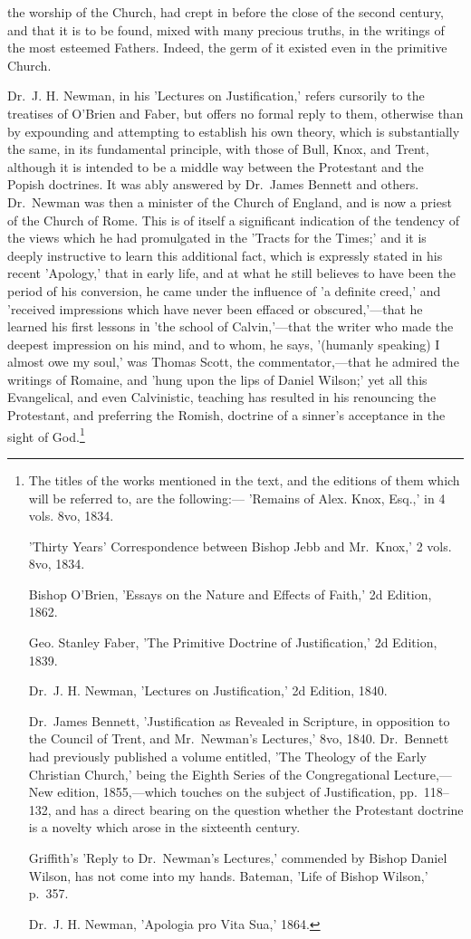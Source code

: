 \documentclass[
]{book}
\begin{document}
the worship of the Church, had crept in before the close of the second century, and that it is to be found, mixed with many precious truths, in the writings of the most esteemed Fathers. Indeed, the germ of it existed even in the primitive Church.

Dr.~J. H. Newman, in his 'Lectures on Justification,' refers cursorily to the treatises of O'Brien and Faber, but offers no formal reply to them, otherwise than by expounding and attempting to establish his own theory, which is substantially the same, in its fundamental principle, with those of Bull, Knox, and Trent, although it is intended to be a middle way between the Protestant and the Popish doctrines. It was ably answered by Dr.~James Bennett and others. Dr.~Newman was then a minister of the Church of England, and is now a priest of the Church of Rome. This is of itself a significant indication of the tendency of the views which he had promulgated in the 'Tracts for the Times;' and it is deeply instructive to learn this additional fact, which is expressly stated in his recent 'Apology,' that in early life, and at what he still believes to have been the period of his conversion, he came under the influence of 'a definite creed,' and 'received impressions which have never been effaced or obscured,'---that he learned his first lessons in 'the school of Calvin,'---that the writer who made the deepest impression on his mind, and to whom, he says, '(humanly speaking) I almost owe my soul,' was Thomas Scott, the commentator,---that he admired the writings of Romaine, and 'hung upon the lips of Daniel Wilson;' yet all this Evangelical, and even Calvinistic, teaching has resulted in his renouncing the Protestant, and preferring the Romish, doctrine of a sinner's acceptance in the sight of God.\footnote{The titles of the works mentioned in the text, and the editions of them which will be referred to, are the following:---
  'Remains of Alex. Knox, Esq.,' in 4 vols. 8vo, 1834.

  'Thirty Years' Correspondence between Bishop Jebb and Mr.~Knox,' 2 vols. 8vo, 1834.

  Bishop O'Brien, 'Essays on the Nature and Effects of Faith,' 2d Edition, 1862.

  Geo. Stanley Faber, 'The Primitive Doctrine of Justification,' 2d Edition, 1839.

  Dr.~J. H. Newman, 'Lectures on Justification,' 2d Edition, 1840.

  Dr.~James Bennett, 'Justification as Revealed in Scripture, in opposition to the Council of Trent, and Mr.~Newman's Lectures,' 8vo, 1840. Dr.~Bennett had previously published a volume entitled, 'The Theology of the Early Christian Church,' being the Eighth Series of the Congregational Lecture,---New edition, 1855,---which touches on the subject of Justification, pp.~118--132, and has a direct bearing on the question whether the Protestant doctrine is a novelty which arose in the sixteenth century.

  Griffith's 'Reply to Dr.~Newman's Lectures,' commended by Bishop Daniel Wilson, has not come into my hands. Bateman, 'Life of Bishop Wilson,' p.~357.

  Dr.~J. H. Newman, 'Apologia pro Vita Sua,' 1864.}
\end{document}

